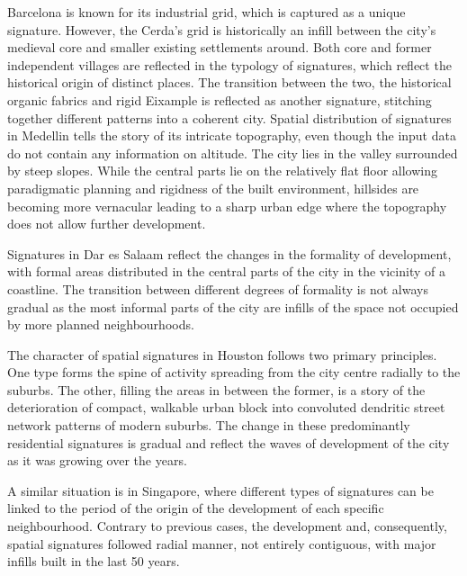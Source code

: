 Barcelona is known for its industrial grid, which is captured as a unique
signature. However, the Cerda’s grid is historically an infill between the
city's medieval core and smaller existing settlements around. Both core and
former independent villages are reflected in the typology of signatures, which
reflect the historical origin of distinct places. The transition between the
two, the historical organic fabrics and rigid Eixample is reflected as another
signature, stitching together different patterns into a coherent city.
Spatial distribution of signatures in Medellin tells the story of its intricate
topography, even though the input data do not contain any information on
altitude. The city lies in the valley surrounded by steep slopes. While the
central parts lie on the relatively flat floor allowing paradigmatic planning
and rigidness of the built environment, hillsides are becoming more vernacular
leading to a sharp urban edge where the topography does not allow further
development.

Signatures in Dar es Salaam reflect the changes in the formality of development,
with formal areas distributed in the central parts of the city in the vicinity
of a coastline. The transition between different degrees of formality is not
always gradual as the most informal parts of the city are infills of the space
not occupied by more planned neighbourhoods.

The character of spatial signatures in Houston follows two primary principles.
One type forms the spine of activity spreading from the city centre radially to
the suburbs. The other, filling the areas in between the former, is a story of
the deterioration of compact, walkable urban block into convoluted dendritic
street network patterns of modern suburbs. The change in these predominantly
residential signatures is gradual and reflect the waves of development of the
city as it was growing over the years.

A similar situation is in Singapore, where different types of signatures can be
linked to the period of the origin of the development of each specific
neighbourhood. Contrary to previous cases, the development and, consequently,
spatial signatures followed radial manner, not entirely contiguous, with major
infills built in the last 50 years.

